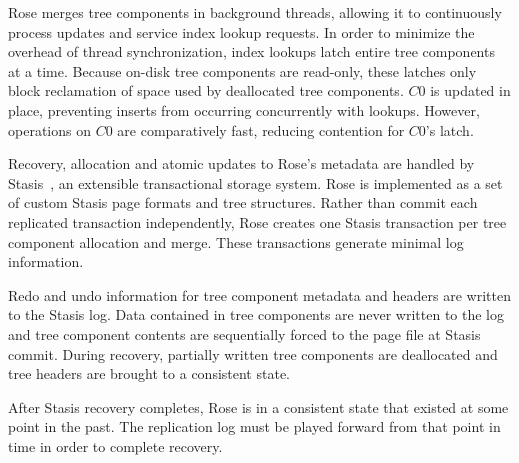 \documentclass{vldb}
\newcommand{\rows}{Rose\xspace}
\newcommand{\rowss}{Rose's\xspace}
\begin{document}
\rows merges tree components in background threads, allowing
it to continuously process updates and service index lookup requests.
In order to minimize the overhead of thread synchronization, index
lookups latch entire tree components at a time.  Because on-disk tree
components are read-only, these latches only block reclamation of
space used by deallocated tree components.  $C0$ is
updated in place, preventing inserts from occurring concurrently with
lookups.  However, operations on $C0$ are comparatively
fast, reducing contention for $C0$'s latch.

Recovery, allocation and atomic updates to \rowss metadata are
handled by Stasis~\cite{stasis}, an extensible transactional storage
system.  \rows is implemented as a set of custom Stasis page formats
and tree structures.  Rather than commit each replicated transaction
independently, \rows creates one Stasis transaction per tree component
allocation and merge.  These transactions generate minimal log
information.

Redo and undo information for tree component metadata and headers are
written to the Stasis log.  Data contained in tree components are
never written to the log and tree component contents are sequentially
forced to the page file at Stasis commit.  During recovery,
partially written tree components are deallocated and tree headers are
brought to a consistent state.

After Stasis recovery completes, \rows is in a consistent state that
existed at some point in the past.  The replication log must be
played forward from that point in time in order to complete recovery.


\end{document}
